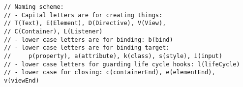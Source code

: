 \begin{verbatim}
// Naming scheme:
// - Capital letters are for creating things:
// T(Text), E(Element), D(Directive), V(View),
// C(Container), L(Listener)
// - lower case letters are for binding: b(bind)
// - lower case letters are for binding target:
//     p(property), a(attribute), k(class), s(style), i(input)
// - lower case letters for guarding life cycle hooks: l(lifeCycle)
// - lower case for closing: c(containerEnd), e(elementEnd), v(viewEnd)
\end{verbatim}
